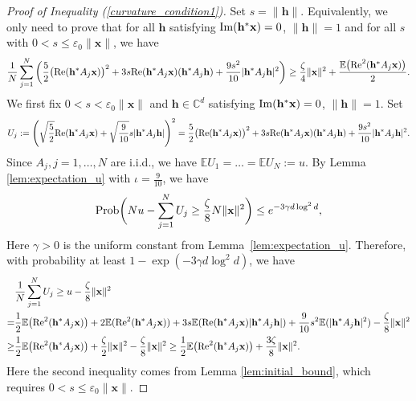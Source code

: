 \documentclass{article}
\renewcommand{\eqref}[1]{(\ref{#1})}
\newcommand{\C}{{\mathbb C}}
\newcommand{\E}{{\mathbb E}}
\newcommand{\Prob}{{\rm Prob}}
\newcommand{\re}{{\rm Re}}
\newcommand{\im}{{\rm Im}}
\newcommand{\vx}{{\mathbf x}}
\newcommand{\vh}{{\mathbf h}}
\newcommand{\0}{{\mathbf 0}}
\numberwithin{equation}{section}
\begin{document}
	\begin{proof}[Proof of Inequality \eqref{curvature_condition1}] 
		Set $s=\|\vh\|$. Equivalently, we only need to prove that for all  $ \vh $ satisfying $\im(\vh^*\vx)=0 $, $ \|\vh\|=1 $ and for all $ s $ with $ 0< s\le\varepsilon_0\|\vx\| $, we have 
		\begin{equation}\label{curvature_condition1-1}
			\frac{1}{N}\sum^N_{j=1}\left(\frac{5}{2}\big(\re(\vh^*A_j\vx)\big)^2
			+3s\re(\vh^*A_j\vx)(\vh^*A_j\vh)+\frac{9s^2}{10}|\vh^*A_j\vh|^2\right)\ge\frac{\zeta}{4}\|\vx\|^2+\frac{ \E\big(\re^2(\vh^*A_j\vx)\big)}{2}.
		\end{equation}  
		We first fix $0<s<\varepsilon_0\|\vx\|$ and $\vh\in\C^d$ satisfying $\im(\vh^*\vx)=0 $, $ \|\vh\|=1 $. Set 
		\begin{align*}
			U_j : =\Bigg( \sqrt{\frac{5}{2}}\re(\vh^*A_j\vx)+\sqrt{\frac{9}{10}}s|\vh^*A_j\vh|\Bigg)^2= \frac{5}{2}\big(\re(\vh^*A_j\vx)\big)^2
			+3s\re(\vh^*A_j\vx)(\vh^*A_j\vh)+\frac{9s^2}{10}|\vh^*A_j\vh|^2.
		\end{align*}                                                                                  
		Since $ A_j, j=1,\ldots,N $ are i.i.d., we have $\E U_1=\ldots=\E U_N:=u$. By Lemma \ref{lem:expectation_u} with $\iota=\frac{9}{10}$, we have 
		\[
		\Prob\bigg(Nu - \sum_{j=1}^{N}U_j\geq\frac{\zeta}{8}N\|\vx\|^2 \bigg)\leq e^{-3\gamma d\log^2d},
		\]
		Here $\gamma>0$ is the uniform constant from Lemma~\ref{lem:expectation_u}. 
		Therefore, with probability at least $ 1-\exp(-3\gamma d\log^2d) $, we have
		\begin{equation}
			\label{curvature_cond_fixh}
			\begin{split}
				&\frac{1}{N}\sum_{j=1}^{N}U_j\geq u- \frac{\zeta}{8}\|\vx\|^2\\
				=&\frac{1}{2}\E\big(\re^2(\vh^*A_j\vx)\big)+2\E(\re^2(\vh^*A_j\vx)) + 3s\E(\re(\vh^*A_j\vx)|\vh^*A_j\vh|)+\frac{9}{10}s^2\E(|\vh^*A_j\vh|^2)-\frac{\zeta}{8}\|\vx\|^2\\
				\geq& \frac{1}{2}\E\big(\re^2(\vh^*A_j\vx)\big)+\frac{\zeta}{2}\|\vx\|^2-\frac{\zeta}{8}\|\vx\|^2
				\geq	 \frac{1}{2}\E\big(\re^2(\vh^*A_j\vx)\big)+\frac{3\zeta}{8}\|\vx\|^2.
			\end{split}
		\end{equation}
		Here the second inequality comes from Lemma \ref{lem:initial_bound}, which requires $0<s\le\varepsilon_0\|\vx\|$. 
		

\end{proof}
\end{document}
